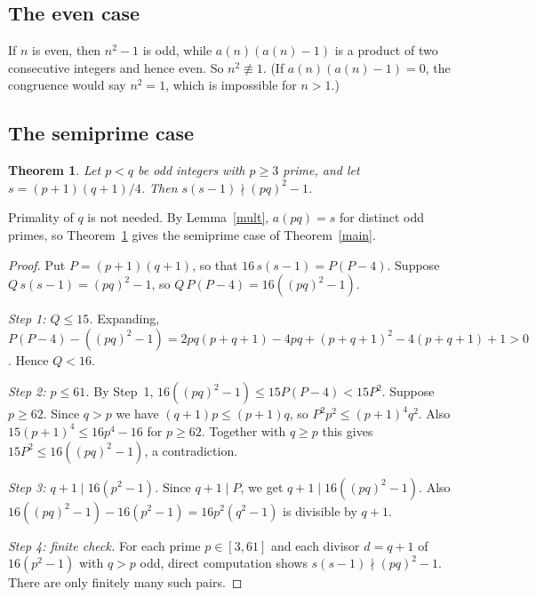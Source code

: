 \documentclass[11pt]{article}
\newtheorem{theorem}{Theorem}
\theoremstyle{remark}\newtheorem{remark}[theorem]{Remark}
\begin{document}
\subsection{The even case}
If $n$ is even, then $n^2-1$ is odd, while $a(n)(a(n)-1)$ is a product of two consecutive integers and hence even. So $n^2\not\equiv 1$. (If $a(n)(a(n)-1)=0$, the congruence would say $n^2=1$, which is impossible for $n>1$.)

\subsection{The semiprime case}
\begin{theorem}\label{pq}
Let $p<q$ be odd integers with $p\ge 3$ prime, and let $s=(p+1)(q+1)/4$. Then $s(s-1)\nmid (pq)^2-1$.
\end{theorem}
Primality of $q$ is not needed. By Lemma~\ref{mult}, $a(pq)=s$ for distinct odd primes, so Theorem~\ref{pq} gives the semiprime case of Theorem~\ref{main}.
\begin{proof}
Put $P=(p+1)(q+1)$, so that $16\,s(s-1)=P(P-4)$. Suppose $Q\,s(s-1)=(pq)^2-1$, so $Q\,P(P-4)=16((pq)^2-1)$.

\emph{Step 1: $Q\le 15$.} Expanding, $P(P-4)-((pq)^2-1)=2pq(p+q+1)-4pq+(p+q+1)^2-4(p+q+1)+1>0$. Hence $Q<16$.

\emph{Step 2: $p\le 61$.} By Step~1, $16((pq)^2-1)\le 15P(P-4)<15P^2$. Suppose $p\ge 62$. Since $q>p$ we have $(q+1)p\le (p+1)q$, so $P^2p^2\le (p+1)^4q^2$. Also $15(p+1)^4\le 16p^4-16$ for $p\ge 62$. Together with $q\ge p$ this gives $15P^2\le 16((pq)^2-1)$, a contradiction.

\emph{Step 3: $q+1\mid 16(p^2-1)$.} Since $q+1\mid P$, we get $q+1\mid 16((pq)^2-1)$. Also $16((pq)^2-1)-16(p^2-1)=16p^2(q^2-1)$ is divisible by $q+1$.

\emph{Step 4: finite check.} For each prime $p\in[3,61]$ and each divisor $d=q+1$ of $16(p^2-1)$ with $q>p$ odd, direct computation shows $s(s-1)\nmid (pq)^2-1$. There are only finitely many such pairs.
\end{proof}
\end{document}
